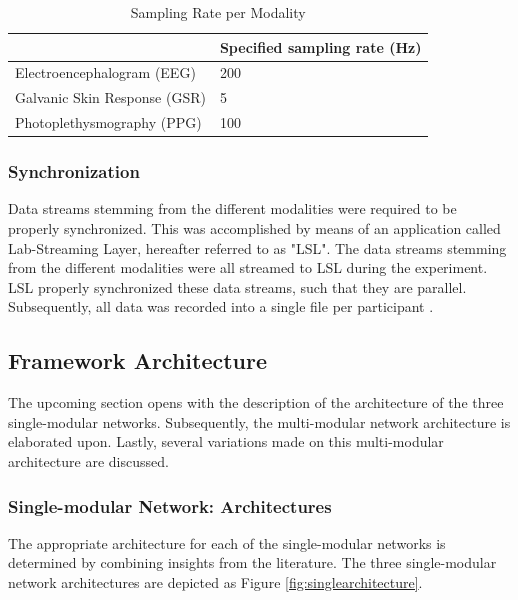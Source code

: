 \documentclass[12pt]{article}
\begin{document}
\bgroup
\def\arraystretch{1.6}%
\begin{table}[h]
\bigskip
\caption{Sampling Rate per Modality}
\label{table:samplingrate}
\begin{tabular}{ll}
    & Specified sampling rate (Hz) \\ \hline
 Electroencephalogram (EEG) & 200                         \\
Galvanic Skin Response (GSR) & 5                           \\
Photoplethysmography (PPG) & 100                         \\ \hline
\end{tabular}
\end{table}
\bigskip
\egroup

\subsubsection{Synchronization}
Data streams stemming from the different modalities were required to be properly synchronized. This was accomplished by means of an application called Lab-Streaming Layer, hereafter referred to as "LSL". The data streams stemming from the different modalities were all streamed to LSL during the experiment. LSL properly synchronized these data streams, such that they are parallel. Subsequently, all data was recorded into a single file per participant \cite{kothe2018lab}.
\bigskip

\subsection{Framework Architecture}
The upcoming section opens with the description of the architecture of the three single-modular networks. Subsequently, the multi-modular network architecture is elaborated upon. Lastly, several variations made on this multi-modular architecture are discussed. 

\subsubsection{Single-modular Network: Architectures}
The appropriate architecture for each of the single-modular networks is determined by combining insights from the literature. The three single-modular network architectures are depicted as Figure \ref{fig:singlearchitecture}.
\end{document}
